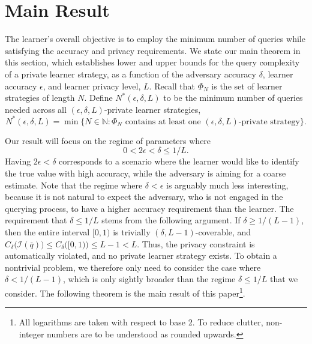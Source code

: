 \documentclass[final,12pt]{colt2018}
\def\calI{\mathcal{I}}
\def\jc#1{{\color{black} [Comment: #1]}}
\begin{document}
\section{Main Result}\label{sec:complex_results}
The {learner}'s overall objective is to employ the minimum number of queries while satisfying the accuracy and privacy requirements. We state our main theorem in this section, which establishes lower and upper bounds for the query complexity of a private {learner} strategy, as a function of the adversary accuracy $\delta$, {learner} accuracy $\epsilon$, and {learner} privacy level, $L$. Recall that $\Phi_N$ is the set of {learner} strategies of length $N$. Define $N^*(\epsilon,\delta,L)$ to be the minimum number of queries needed across all $(\epsilon,\delta,L)$-private {learner} strategies, 
\begin{equation}
\label{eqn:definition of N2}
N^*(\epsilon,\delta,L)=\min\big\{N\in\mathbb{N}: \text{$\Phi_N$ contains at least one $(\epsilon,\delta,L)$-private strategy}\big\}. 
\end{equation}

Our result will focus on the regime of parameters where 
\begin{equation}
0<2\epsilon<\delta\leq1/L. 
\end{equation}
Having $2\epsilon<\delta $ corresponds to a scenario where the {learner} would like to identify the true value with high accuracy, while the adversary is aiming for a coarse estimate.  Note that the regime where $\delta<\epsilon$ is arguably much less interesting, because  it is not natural to expect the adversary, who is not engaged in the querying process, to have a higher accuracy requirement than the {learner}. The requirement that $\delta\leq1/L$ stems 
{from the 
following argument. If $\delta\geq 1/(L-1)$, then 
the entire interval $[0,1)$ is trivially $(\delta,L-1)$-coverable, and  $C_\delta\big(\calI(\overline{q})\big)
\leq C_\delta\big([0,1)\big)\leq L-1 <L$. Thus, the privacy constraint is automatically  violated, and no private {learner} strategy exists. 
To obtain a nontrivial problem, we therefore only need to consider the case where $\delta< 1/(L-1)$, which is only sightly broader than the regime $\delta\leq 1/L$ that we consider. 
}
The following theorem is the main result of this paper\footnote{All logarithms are taken with respect to base 2. To reduce clutter, non-integer numbers are to be understood as  rounded upwards.}.
\end{document}
